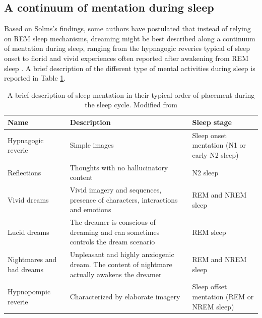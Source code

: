 \subsection{A continuum of mentation during sleep}
\label{sec:dream-research:link:continuum}

Based on Solms’s findings, some authors have postulated that instead of relying on REM sleep mechanisms, dreaming might be best described along a continuum of mentation during sleep, ranging from the hypnagogic reveries typical of sleep onset to florid and vivid experiences often reported after awakening from REM sleep \citep{schwartz_dreaming:_2005}. A brief description of the different type of mental activities during sleep is reported in Table \ref{tab:intro:continuum}.

\begin{table}[htb]
	\caption[A brief description of sleep mentation in their typical order of placement during the sleep cycle]{A brief description of sleep mentation in their typical order of placement during the sleep cycle. Modified from \citet{de_koninck_sleep_2012}}
	\label{tab:intro:continuum}
	\begin{tabularx}{\textwidth}{XXX}
	\toprule
	Name                  		   & Description                                                                          		   & Sleep stage                         			\\ \midrule
	Hypnagogic reverie             & Simple images                                                                                 & Sleep onset mentation (N1 or early N2 sleep) 	\\
	Reflections                    & Thoughts with no hallucinatory content                                                        & N2 sleep                                     	\\
	Vivid dreams                   & Vivid imagery and sequences, presence of characters, interactions and emotions                & REM and NREM sleep                           	\\
	Lucid dreams                   & The dreamer is conscious of dreaming and can sometimes controls the dream scenario            & REM sleep                                    	\\
	Nightmares and bad dreams 	   & Unpleasant and highly anxiogenic dream. The content of nightmare actually awakens the dreamer & REM and NREM sleep                             \\
	Hypnopompic reverie            & Characterized by elaborate imagery                                                            & Sleep offset mentation (REM or NREM sleep)   	\\ \bottomrule
	\end{tabularx}
\end{table}


